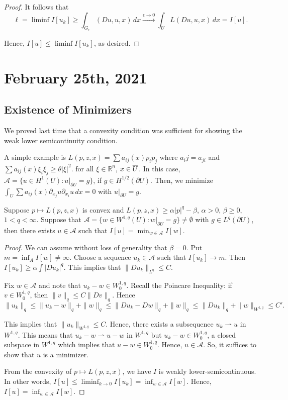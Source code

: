 \documentclass[12pt]{scrartcl}
\newcommand{\R}{\mathbb{R}}
\newcommand{\<}{\langle}
\renewcommand{\>}{\rangle}
\let \mc \mathcal
\let \weakto \rightharpoonup
\begin{document}
\begin{proof}
It follows that $$\ell = \liminf I[u_k] \ge \int_{G_\epsilon}(Du, u, x)\,dx  \xrightarrow{\epsilon \to 0} \int_U L(Du, u, x)\,dx = I[u].$$

Hence, $I[u] \le \liminf I[u_k]$, as desired.

\end{proof}

\pagebreak
\section{February 25th, 2021}
\subsection{Existence of Minimizers}
We proved last time that a convexity condition was sufficient for showing the weak lower semicontinuity condition.   
\begin{example} A simple example is $L(p, z, x) = \sum a_{ij}(x) p_ip_j$ where $a_ij = a_{ji}$ and $\sum a_{ij}(x) \xi_i \xi_j \ge \theta|\xi|^2.$ for all $\xi \in \R^n$, $x \in \overline{U}$.  In this case, $\mc A = \{u \in H^1(U): u\vert_{\partial U} = g\}$, if $g \in H^{1/2}(\partial U)$.  Then, we minimize $\int_U \sum a_{ij}(x)\partial_{x_j}u \partial_{x_i} u \,dx = 0$ with $u\vert_{\partial U} = g$.
\end{example}

\begin{thm} Suppose $p \mapsto L(p, z, x)$ is convex and $L(p, z, x) \ge \alpha|p|^q - \beta$, $\alpha > 0$, $\beta \ge 0$, $1 < q < \infty$.  Suppose that $\mc A = \{w \in W^{1, q}(U): w \vert_{\partial U}= g\} \ne \emptyset$ with $g \in L^q(\partial U)$, then there exists $u \in \mc A$ such that $I[u] = \min_{w \in \mc A} I[w]$.
\end{thm}
\begin{proof}
We can assume without loss of generality that $\beta = 0$.  Put $m = \inf_A I[w] \ne \infty$.  Choose a sequence $u_k \in \mc A$ such that $I[u_k] \to m$.  Then $I[u_k] \ge \alpha \int |Du_k|^q$.  This implies that $\|Du_k\|_{L^q} \le C$.

Fix $w \in \mc A $ and note that $u_k - w \in W_0^{1, q}$.  Recall the Poincare Inequality: if $v \in W_0^{1, q}$, then $\|v\|_q \le C\|Dv\|_q$.  Hence $$\|u_k\|_q \le \|u_k - w\|_q + \|w\|_q \le \|Du_k - Dw\|_q + \|w\|_q \le \|Du_k\|_q + \|w\|_{W^{1, q}}\le C'.$$

This implies that $\|u_k\|_{W^{1, q}} \le C$.  Hence, there exists a subsequence $u_k \weakto u$ in $W^{1, q}$.  This means that $u_k - w \weakto u - w$ in $W^{1, q}$ but $u_k - w \in W_0^{1, q}$, a closed subspace in $W^{1, q}$ which implies that $u - w \in W_0^{1, q}$.  Hence, $u \in \mc A$. So, it suffices to show that $u$ is a minimizer.  

From the convexity of $p \mapsto L(p, z, x)$, we have $I$ is weakly lower-semicontinuous.  In other words, $I[u] \le \liminf_{k \to 0} I[u_k] = \inf_{w \in \mc A} I[w]$. Hence, $I[u] = \inf_{w \in \mc A} I[w]$.

\end{proof}
\end{document}

